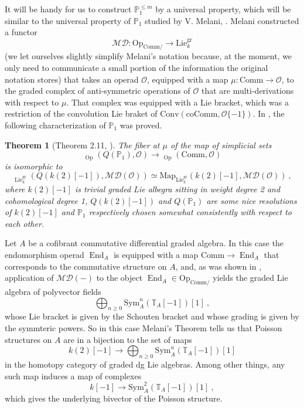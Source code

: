 \documentclass[10pt, oneside]{amsart}
\theoremstyle{plain}
\newtheorem*{theorem*}{Theorem}
\newcommand{\comm}{\mathrm{Comm}}
\newcommand{\ccomm}{\mathrm{coComm}}
\newcommand{\conv}{\mathrm{Conv}}
\DeclareMathOperator{\en}{End}
\newcommand{\lie}{\mathrm{Lie}}
\newcommand{\map}{\mathrm{Map}}
\renewcommand{\O}{\mathcal{O}}
\newcommand{\op}{\mathrm{Op}}
\newcommand{\PP}{\mathbb{P}}
\newcommand{\sym}{\mathrm{Sym}}
\newcommand{\TT}{\mathbb{T}}
\DeclareMathOperator{\uhom}{\underline{Hom}}
\begin{document}
It will be handy for us to construct $\PP_1^{\le m}$ by a universal property, which will be similar to the universal property of 
$\PP_1$ studied by V. Melani, \cite{Melani}. Melani constructed a functor
\begin{equation}\label{multi-derivations}
\mathcal{MD} \colon {\op}_{\comm/} \longrightarrow \lie^\text{gr}_k 
\end{equation}
(we let ourselves slightly simplify Melani's notation because,
at the moment, we only need to communicate a small portion of the information the original notation stores) that
takes an operad $\O$, equipped with a map $\mu \colon \comm \to \O$, to the graded complex of anti-symmetric operations of $\O$ that
are multi-derivations with respect to $\mu$. That complex was equipped with a Lie bracket, which was a restriction of the convolution
Lie braket of $\conv(\ccomm, \O\{-1\})$. In \cite{Melani}, the following characterization of $\PP_1$ was proved.
\begin{theorem*}[Theorem 2.11, \cite{Melani}]
The fiber at $\mu$ of the map of simplicial sets
\begin{equation*}
\uhom_\op (Q(\PP_1), \O) \longrightarrow \uhom_\op (\comm, \O)
\end{equation*}
is isomorphic to
\begin{equation*}
\uhom_{\lie_k^\mathrm{gr}} (Q(k(2)[-1]), \mathcal{MD}(\O)) \simeq \map_{\lie_k^\mathrm{gr}} (k(2)[-1], \mathcal{MD}(\O)) \:,
\end{equation*}
where $k(2)[-1]$ is trivial graded Lie albegra sitting in weight degree 2 and cohomological degree 1, $Q(k(2)[-1])$ and $Q(\PP_1)$ are
some nice resolutions of $k(2)[-1]$ and $\PP_1$ respectively chosen somewhat consistently with respect to each other.
\end{theorem*}
\begin{example}\label{intro-ex1}
Let $A$ be a cofibrant commutative differential graded algebra. In this case the endomorphism operad $\en_A$ is equipped with a map
$\comm \to \en_A$ that corresponds to the commutative structure on $A$, and, as was shown in \cite{Melani},
application of $\mathcal{MD}(-)$ to the object $\en_A \in \op_{\comm/}$ yields the graded Lie algebra of polyvector fields
\begin{equation*}
\bigoplus_{n \ge 0} \sym_A^n (\TT_A[-1]) [1] \:,
\end{equation*}
whose Lie bracket is given by the Schouten bracket and whose grading is given by the symmteric powers.
So in this case Melani's Theorem tells us that Poisson structures on $A$ are in a bijection to the set of maps
\begin{equation*}
k(2)[-1] \longrightarrow \bigoplus_{n \ge 0} \sym_A^n (\TT_A[-1]) [1]
\end{equation*}
in the homotopy category of graded dg Lie algebras. Among other things, any such map induces a map of complexes
\begin{equation*}
k[-1] \longrightarrow \sym^2_A(\TT_A[-1])[1] \:,
\end{equation*}
which gives the underlying bivector of the Poisson structure.
\end{example}
\end{document}
